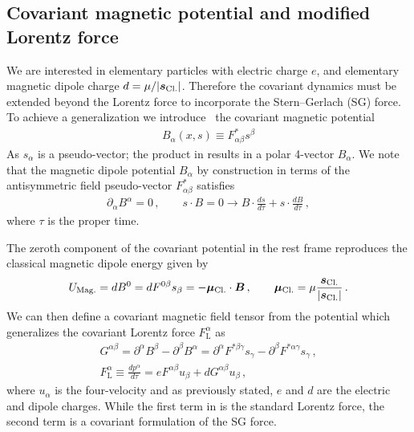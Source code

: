 \subsection{Covariant magnetic potential and modified Lorentz force}
\label{sec:magpotential}
We are interested in elementary particles with electric charge $e$, and elementary magnetic dipole charge $d=\mu/|\boldsymbol{s}_\mathrm{Cl.}|$. Therefore the covariant dynamics must be extended beyond the Lorentz force to incorporate the Stern–Gerlach (SG) force. To achieve a generalization we introduce~\citep{Rafelski:2017hce} the covariant magnetic potential
\begin{gather}
    \label{bpot:1}
    B_{\alpha}(x,s)\equiv F_{\alpha\beta}^{*}s^{\beta}
\end{gather}
As $s_{\alpha}$ is a pseudo-vector; the product in  results in a polar 4-vector $B_{\alpha}$. We note that the magnetic dipole potential $B_{\alpha}$ by construction in terms of the antisymmetric field pseudo-vector $F_{\alpha\beta}^{*}$ satisfies
\begin{gather}
    \label{bpot:2}
    \partial_{\alpha}B^{\alpha}=0\,,\qquad s\cdot B=0 \rightarrow B\cdot\frac{ds}{d\tau}+s\cdot\frac{dB}{d\tau}\,,
\end{gather}
where $\tau$ is the proper time.

The zeroth component of the covariant potential in the rest frame  reproduces the classical magnetic dipole energy given by
\begin{gather}
    U_\mathrm{Mag.}=dB^{0}=dF^{0\beta}s_{\beta}=-\boldsymbol{\mu}_\mathrm{Cl.}\cdot\boldsymbol{B}\,,\qquad \boldsymbol{\mu}_\mathrm{Cl.}=\mu\frac{\boldsymbol{s}_\mathrm{Cl.}}{|\boldsymbol{s}_\mathrm{Cl.}|}\,.
\end{gather}
We can then define a covariant magnetic field tensor from the potential  which generalizes the covariant Lorentz force $F_\mathrm{L}^{\alpha}$ as
\begin{gather}
    \label{LSG02}
    G^{\alpha\beta}=\partial^{\alpha}B^{\beta}-\partial^{\beta}B^{\alpha}= \partial^{\alpha}F^{*\beta\gamma}s_{\gamma}-\partial^{\beta}F^{*\alpha\gamma}s_{\gamma}\,,\\
    \label{LSG01}
    F_\mathrm{L}^{\alpha}\equiv\frac{dp^{\alpha}}{d\tau}=eF^{\alpha\beta}u_{\beta}+dG^{\alpha\beta}u_{\beta}\,,
\end{gather}
where $u_{\alpha}$ is the four-velocity and as previously stated, $e$ and $d$ are the electric and dipole charges. While the first term in  is the standard Lorentz force, the second term is a covariant formulation of the SG force.

